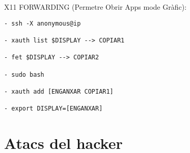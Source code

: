 \documentclass[]{article}
\begin{document}
X11 FORWARDING (Permetre Obrir Apps mode Gràfic):

\begin{verbatim}
- ssh -X anonymous@ip

- xauth list $DISPLAY --> COPIAR1

- fet $DISPLAY --> COPIAR2

- sudo bash

- xauth add [ENGANXAR COPIAR1]

- export DISPLAY=[ENGANXAR]
\end{verbatim}

\hypertarget{atacs-del-hacker}{%
\section{\texorpdfstring{\textbf{Atacs del
hacker}}{Atacs del hacker}}\label{atacs-del-hacker}}
\end{document}
